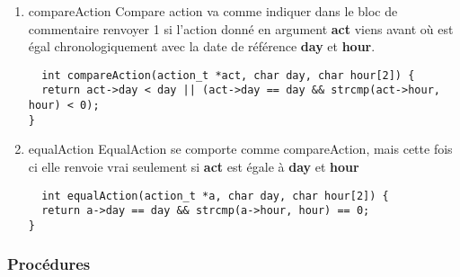 \documentclass[11pt]{article}
\begin{document}
\begin{enumerate}
\item compareAction
\label{sec:orge4c8a52}
Compare action va comme indiquer dans le bloc de commentaire renvoyer 1 si
l'action donné en argument \textbf{act} viens avant où est égal chronologiquement avec la date
de référence \textbf{day} et \textbf{hour}.
\begin{lstlisting}
  int compareAction(action_t *act, char day, char hour[2]) {
  return act->day < day || (act->day == day && strcmp(act->hour, hour) < 0);
}
\end{lstlisting}


\item equalAction
\label{sec:orgad93453}
EqualAction se comporte comme compareAction, mais cette fois ci elle
renvoie vrai seulement si \textbf{act} est égale à \textbf{day} et \textbf{hour}
\begin{lstlisting}
  int equalAction(action_t *a, char day, char hour[2]) {
  return a->day == day && strcmp(a->hour, hour) == 0;
}
\end{lstlisting}
\end{enumerate}




\subsubsection{Procédures}
\label{sec:org149fa56}
\end{document}
